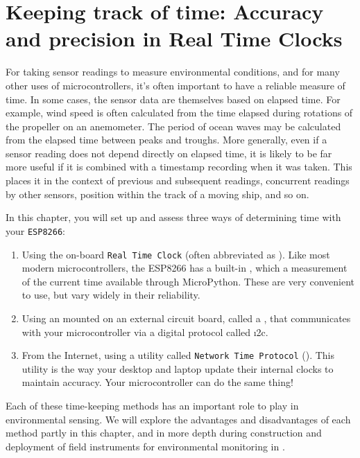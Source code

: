\setchapterpreamble[u]{\margintoc}
\chapter{Keeping track of time: Accuracy and precision in Real Time Clocks}

For taking sensor readings to measure environmental conditions, and for many other uses of microcontrollers, it’s often important to have a reliable measure of time. 
In some cases, the sensor data are themselves based on elapsed time.
For example, wind speed is often calculated from the time elapsed during rotations of the propeller on an anemometer. 
The period of ocean waves may be calculated from the elapsed time between peaks and troughs. 
More generally, even if a sensor reading does not depend directly on elapsed time, it is likely to be far more useful if it is combined with a timestamp recording when it was taken. 
This places it in the context of previous and subsequent readings, concurrent readings by other sensors, position within the track of a moving ship, and so on.


In this chapter, you will set up and assess three ways of determining time with your \texttt{ESP8266}:
\begin{enumerate}
	\item Using the on-board \texttt{Real Time Clock} (often abbreviated as \rtc). 
	Like most modern microcontrollers, the ESP8266 has a built-in \rtc, which a measurement of the current time available through MicroPython. 
	These are very convenient to use, but vary widely in their reliability.

	\item Using an \rtc mounted on an external circuit board, called a , that communicates with your microcontroller via a digital protocol called \i2c.

	\item From the Internet, using a utility called \texttt{Network Time Protocol} (\ntp). 
	This utility is the way your desktop and laptop update their internal clocks to maintain accuracy. 
	Your microcontroller can do the same thing!
\end{enumerate}
Each of these time-keeping methods has an important role to play in environmental sensing. 
We will explore the advantages and disadvantages of each method partly in this chapter, and in more depth during construction and deployment of field instruments for environmental monitoring in .

